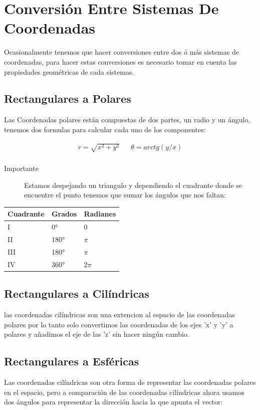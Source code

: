 \documentclass{article}
\begin{document}
\section{Conversión Entre Sistemas De Coordenadas}
\label{sec:org52e7725}
Ocasionalmente tenemos que hacer conversiones entre dos ó más sistemas de coordenadas, para hacer estas conversiones es necesario tomar en cuenta las propiedades geométricas de cada sistemas.

\subsection{Rectangulares a Polares}
\label{sec:org4d811fd}
Las Coordenadas polares están compuestas de dos partes, un radio y un ángulo, tenemos dos formulas para calcular cada uno de los componentes: 

\[\begin{aligned}
 r = \sqrt{x^2+y^2} && \theta = arctg\left(y/x\right) \\
\end{aligned}\] 

\begin{description}
\item[{Importante}] Estamos despejando un triangulo y dependiendo el cuadrante donde se encuentre el punto tenemos que sumar los ángulos que nos faltan:
\end{description}

\begin{center}
\label{tab:org5b24ba4}
\begin{tabular}{lll}
Cuadrante & Grados & Radianes\\
\hline
I & 0° & 0\\
II & 180° & \(\pi\)\\
III & 180° & \(\pi\)\\
IV & 360° & 2\(\pi\)\\
\end{tabular}
\end{center}

\subsection{Rectangulares a Cilíndricas}
\label{sec:org3a67296}
las coordenadas cilíndricas son una extencion al espacio de las coordenadas polares por lo tanto solo convertimos las coordenadas de los ejes 'x' y 'y' a polares y añadimos el eje de las 'z' sin hacer ningún cambio.

\subsection{Rectangulares a Esféricas}
\label{sec:org2768f8a}
Las coordenadas cilíndricas son otra forma de representar las coordenadas polares en el espacio, pero a comparación de las coordenadas cilíndricas ahora usamos dos ángulos para representar la dirección hacia la que apunta el vector: 
\end{document}
